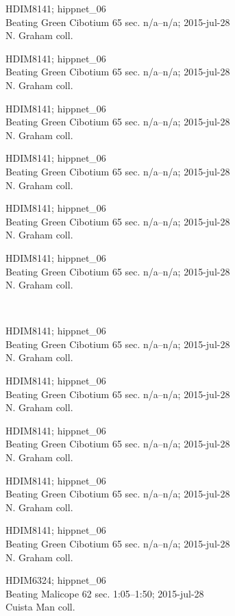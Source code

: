 \documentclass[2pt]{extarticle}
\begin{document}
\noindent
\parbox{0.16\textwidth}{\tiny \raggedright \rule[-0.3\baselineskip]{0pt}{10pt}HDIM8141; hippnet\_06\\ Beating Green Cibotium 65 sec. n/a--n/a; 2015-jul-28\\ N. Graham coll.}
\parbox{0.16\textwidth}{\tiny \raggedright \rule[-0.3\baselineskip]{0pt}{10pt}HDIM8141; hippnet\_06\\ Beating Green Cibotium 65 sec. n/a--n/a; 2015-jul-28\\ N. Graham coll.}
\parbox{0.16\textwidth}{\tiny \raggedright \rule[-0.3\baselineskip]{0pt}{10pt}HDIM8141; hippnet\_06\\ Beating Green Cibotium 65 sec. n/a--n/a; 2015-jul-28\\ N. Graham coll.}
\parbox{0.16\textwidth}{\tiny \raggedright \rule[-0.3\baselineskip]{0pt}{10pt}HDIM8141; hippnet\_06\\ Beating Green Cibotium 65 sec. n/a--n/a; 2015-jul-28\\ N. Graham coll.}
\parbox{0.16\textwidth}{\tiny \raggedright \rule[-0.3\baselineskip]{0pt}{10pt}HDIM8141; hippnet\_06\\ Beating Green Cibotium 65 sec. n/a--n/a; 2015-jul-28\\ N. Graham coll.}
\parbox{0.16\textwidth}{\tiny \raggedright \rule[-0.3\baselineskip]{0pt}{10pt}HDIM8141; hippnet\_06\\ Beating Green Cibotium 65 sec. n/a--n/a; 2015-jul-28\\ N. Graham coll.} \\ 
\vspace{0.001in} 

\noindent
\parbox{0.16\textwidth}{\tiny \raggedright \rule[-0.3\baselineskip]{0pt}{10pt}HDIM8141; hippnet\_06\\ Beating Green Cibotium 65 sec. n/a--n/a; 2015-jul-28\\ N. Graham coll.}
\parbox{0.16\textwidth}{\tiny \raggedright \rule[-0.3\baselineskip]{0pt}{10pt}HDIM8141; hippnet\_06\\ Beating Green Cibotium 65 sec. n/a--n/a; 2015-jul-28\\ N. Graham coll.}
\parbox{0.16\textwidth}{\tiny \raggedright \rule[-0.3\baselineskip]{0pt}{10pt}HDIM8141; hippnet\_06\\ Beating Green Cibotium 65 sec. n/a--n/a; 2015-jul-28\\ N. Graham coll.}
\parbox{0.16\textwidth}{\tiny \raggedright \rule[-0.3\baselineskip]{0pt}{10pt}HDIM8141; hippnet\_06\\ Beating Green Cibotium 65 sec. n/a--n/a; 2015-jul-28\\ N. Graham coll.}
\parbox{0.16\textwidth}{\tiny \raggedright \rule[-0.3\baselineskip]{0pt}{10pt}HDIM8141; hippnet\_06\\ Beating Green Cibotium 65 sec. n/a--n/a; 2015-jul-28\\ N. Graham coll.}
\parbox{0.16\textwidth}{\tiny \raggedright \rule[-0.3\baselineskip]{0pt}{10pt}HDIM6324; hippnet\_06\\ Beating Malicope 62 sec. 1:05--1:50; 2015-jul-28\\ Cuista Man coll.} \\ 
\vspace{0.001in} 
\end{document}
